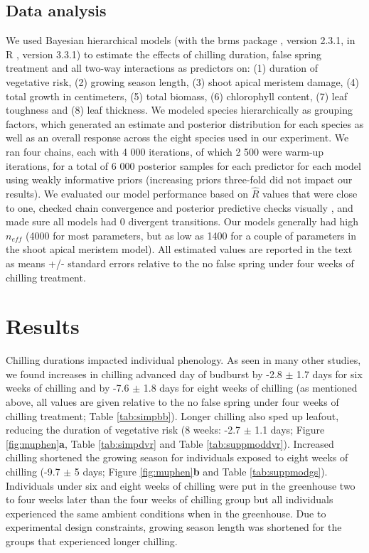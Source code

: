 \documentclass{article}\usepackage[]{graphicx}\usepackage[]{color}
\begin{document}
\subsection*{Data analysis}
We used Bayesian hierarchical models (with the brms package \citep{brms}, version 2.3.1,  in R \citep{R}, version 3.3.1) to estimate the effects of chilling duration, false spring treatment and all two-way interactions as predictors on: (1) duration of vegetative risk, (2) growing season length, (3) shoot apical meristem damage, (4) total growth in centimeters, (5) total biomass, (6) chlorophyll content, (7) leaf toughness and (8) leaf thickness. We modeled species hierarchically as grouping factors, which generated an estimate and posterior distribution for each species as well as an overall response across the eight species used in our experiment. We ran four chains, each with 4 000 iterations, of which 2 500 were warm-up iterations, for a total of 6 000 posterior samples for each predictor for each model using weakly informative priors (increasing priors three-fold did not impact our results). We evaluated our model performance based on $\hat{R}$ values that were close to one, checked chain convergence and posterior predictive checks visually \citep{BDA}, and made sure all models had 0 divergent transitions. Our models generally had high $n_{eff}$ (4000 for most parameters, but as low as 1400 for a couple of parameters in the shoot apical meristem model). All estimated values are reported in the text as means +/- standard errors relative to the no false spring under four weeks of chilling treatment.


\section*{Results} 
Chilling durations impacted individual phenology. As seen in many other studies, we found increases in chilling advanced day of budburst by -2.8 $\pm$ 1.7 days for six weeks of chilling and by -7.6 $\pm$ 1.8 days for eight weeks of chilling (as mentioned above, all values are given relative to the no false spring under four weeks of chilling treatment; Table \ref{tab:simpbb}). Longer chilling also sped up leafout, reducing the duration of vegetative risk (8 weeks: -2.7 $\pm$ 1.1 days; Figure \ref{fig:muphen}\textbf{a}, Table \ref{tab:simpdvr} and Table \ref{tab:suppmoddvr}). Increased chilling shortened the growing season for individuals exposed to eight weeks of chilling (-9.7 $\pm$ 5 days; Figure \ref{fig:muphen}\textbf{b} and Table \ref{tab:suppmodgs}). Individuals under six and eight weeks of chilling were put in the greenhouse two to four weeks later than the four weeks of chilling group but all individuals experienced the same ambient conditions when in the greenhouse. Due to experimental design constraints, growing season length was shortened for the groups that experienced longer chilling.
 
\end{document}
